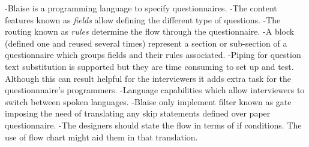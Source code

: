 	-Blaise is a programming language to specify questionnaires.
	-The content features known as \emph{fields} allow defining the different type of questions.
	-The routing known as \emph{rules} determine the flow through the questionnaire.
	-A block (defined one and reused several times) represent a section or sub-section of a questionnaire which groups fields and their rules associated.
	-Piping for question text substitution is supported but they are time consuming to set up and test. Although this can result helpful for the interviewers it adds extra task for the questionnnaire's programmers.
	-Language capabilities which allow interviewers to switch between spoken languages.
	-Blaise only implement filter known as gate imposing the need of translating any skip statements defined over paper questionnaire.
	-The designers should state the flow in terms of if conditions. The use of flow chart might aid them in that translation.

